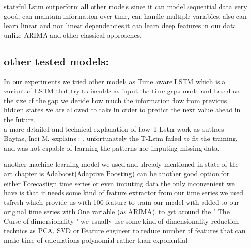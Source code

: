 stateful Lstm outperform all other models since it can model sequential data very good, can maintain information over time, can handle multiple variables, also can learn linear and non linear dependencies,it can  learn deep features in our data unlike ARIMA and other classical approaches.

\subsection{other tested models:}

In our experiments we tried other models as Time aware LSTM \cite{timeaware} which is a variant of  LSTM that try to inculde as input the time gaps made and based on the size of the gap we decide how  much the information flow from previous hidden states we are allowed to take in order to predict the next value ahead in the future.\\a more detailed and technical explanation of how T-Lstm work as authors  Baytas, Inci M.\cite{timeaware} explains : .
unfortunately the T-Lstm failed to fit the training. and was not capable of learning the patterns nor imputing missing data.

another machine learning model we used and already mentioned in state of the art chapter is Adaboost(Adaptive Boosting) can be another good option for either Forecastign time series or even imputing data the only inconvenient we have is that it needs some kind of feature extractor from our time series we used tsfresh\cite{} which provide us with 100 feature to train our model with added to our original time series with One variable (as ARIMA).
to get around the " The Curse of dimensionality " we usually use some kind of dimensionality  reduction technics as PCA, SVD or Feature engineer to reduce number of features that can make time of calculations polynomial rather than exponential.

